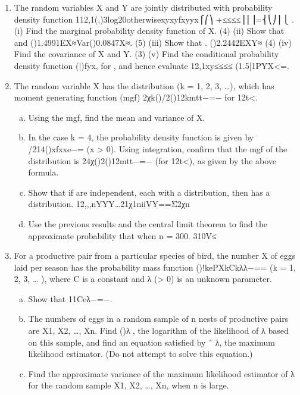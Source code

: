 \begin{enumerate}
\item The random variables X and Y are jointly distributed with probability density function
112,1(,)3log20otherwisexyxyfxyyx⎧⎛⎞ +≤≤≤≤⎪⎜⎟=⎨⎝⎠⎪⎩ .
(i) Find the marginal probability density function of X.
(4)
(ii) Show that and ()1.4991EX≈Var()0.0847X≈.
(5)
(iii) Show that . ()2.2442EXY≈
(4)
(iv) Find the covariance of X and Y.
(3)
(v) Find the conditional probability density function (|)fyx, for , and hence evaluate 12,1xy≤≤≤≤ (1.5|1PYX<=.

\item The random variable X has the distribution (k = 1, 2, 3, …), which has moment generating function (mgf) 2χk()/2()12kmtt−=− for 12t<.
\begin{enumerate}[(a)]
\item  Using the mgf, find the mean and variance of X.
\item  In the case k = 4, the probability density function is given by
/214()xfxxe−= (x > 0).
Using integration, confirm that the mgf of the distribution is 24χ()2()12mtt−=− (for 12t<), as given by the above formula.
\item Show that if are independent, each with a distribution, then has a distribution. 12,,,nYYY…21χ1niiVY==Σ2χn
\item Use the previous results and the central limit theorem to find the approximate probability that when n = 300. 310V≤
\end{enumerate}
\item For a productive pair from a particular species of bird, the number X of eggs laid per season has the probability mass function
()!kePXkCkλλ−== (k = 1, 2, 3, … ),
where C is a constant and λ (> 0) is an unknown parameter.

\begin{enumerate}[(a)]
\item Show that 11Ceλ−=−.
\item The numbers of eggs in a random sample of n nests of productive pairs are X1, X2, …, Xn. Find ()λ􀁁, the logarithm of the likelihood of λ based on this sample, and find an equation satisfied by ˆ
λ, the maximum likelihood estimator. (Do not attempt to solve this equation.)

\item Find the approximate variance of the maximum likelihood estimator of λ for the random sample X1, X2, …, Xn, when n is large.


\end{enumerate}
\end{enumerate}
